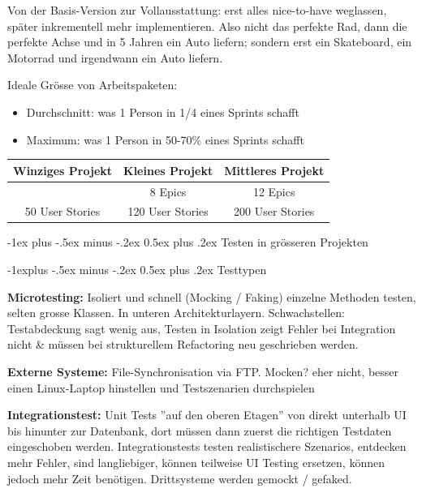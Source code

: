 \documentclass[a4paper, fontsize=6pt]{scrartcl}
\makeatletter
\renewcommand{\section}{\@startsection{section}{1}{0mm}%
    {-1ex plus -.5ex minus -.2ex}%
    {0.5ex plus .2ex}%
    {\normalfont\large\bfseries}}
\renewcommand{\subsection}{\@startsection{subsection}{2}{0mm}%
    {-1explus -.5ex minus -.2ex}%
    {0.5ex plus .2ex}%
    {\normalfont\normalsize\bfseries}}
\makeatother
\begin{document}
\begin{multicols*}{5}
Von der Basis-Version zur Vollausstattung: erst alles nice-to-have weglassen, später inkrementell mehr implementieren. Also nicht das perfekte Rad, dann die perfekte Achse und in 5 Jahren ein Auto liefern; sondern erst ein Skateboard, ein Motorrad und irgendwann ein Auto liefern.

Ideale Grösse von Arbeitspaketen:

\begin{itemize}
    \item Durchschnitt: was 1 Person in 1/4 eines Sprints schafft
    \item Maximum: was 1 Person in 50-70\% eines Sprints schafft
\end{itemize}

\begin{center}
\begin{tabular}{ |c|c|c| } 
 \hline
 Winziges Projekt & Kleines Projekt & Mittleres Projekt \\ 
 \hline
  & 8 Epics & 12 Epics \\ 
 50 User Stories & 120 User Stories & 200 User Stories \\ 
 \hline
\end{tabular}
\end{center}

\section{Testen in grösseren Projekten}

\subsection{Testtypen}

\textbf{Microtesting:} Isoliert und schnell (Mocking / Faking) einzelne Methoden testen, selten grosse Klassen. In unteren Architekturlayern. Schwachstellen: Testabdeckung sagt wenig aus, Testen in Isolation zeigt Fehler bei Integration nicht \& müssen bei strukturellem Refactoring neu geschrieben werden.

\textbf{Externe Systeme:} File-Synchronisation via FTP. Mocken? eher nicht, besser einen Linux-Laptop hinstellen und Testszenarien durchspielen

\textbf{Integrationstest:} Unit Tests ''auf den oberen Etagen'' von direkt unterhalb UI bis hinunter zur Datenbank, dort müssen dann zuerst die richtigen Testdaten eingeschoben werden. Integrationstests testen realistischere Szenarios, entdecken mehr Fehler, sind langliebiger, können teilweise UI Testing ersetzen, können jedoch mehr Zeit benötigen. Drittsysteme werden gemockt / gefaked.


\end{multicols*}
\end{document}
